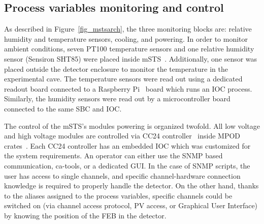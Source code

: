 \subsection{Process variables monitoring and control}
As described in Figure~\ref{fig_mstsarch}, the three monitoring blocks are: relative humidity and temperature sensors, cooling, and powering. In  order to monitor ambient conditions, seven PT100 temperature sensors and one relative humidity sensor (Sensiron SHT85) were placed inside \gls{mSTS}~\cite{SHT85}. Additionally, one sensor was placed outside the detector enclosure to monitor the temperature in the experimental cave. The temperature sensors were read out using a dedicated readout board connected to a Raspberry Pi~\cite{raspberry} board which runs an \gls{IOC} process. Similarly, the humidity sensors were read out by a microcontroller board connected to the same \gls{SBC} and \gls{IOC}.

The control of the \gls{mSTS}'s modules powering is organized twofold. All low voltage and high voltage modules are controlled via CC24 controller~\cite{cc24} inside MPOD crates~\cite{mpod}. Each CC24 controller has an embedded \gls{IOC} which was customized for the system requirements.  An operator can either use the \gls{SNMP} based communication, ca-tools, or a dedicated \gls{GUI}. In the case of SNMP scripts, the user has access to single channels, and specific channel-hardware connection knowledge is required to properly handle the detector. On the other hand, thanks to the aliases assigned to the process variables, specific channels could be switched on (via channel access protocol, PV access, or Graphical User Interface) by knowing the position of the \gls{FEB} in the detector.

